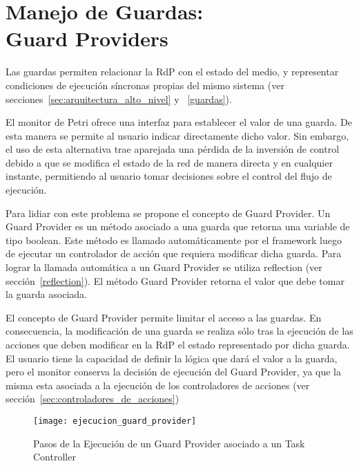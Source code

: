 \section{Manejo de Guardas: \\ Guard Providers}
\label{sec:guard_providers}
Las guardas permiten relacionar la RdP con el estado del medio, y representar
condiciones de ejecución síncronas propias del mismo sistema (ver
secciones~\ref{sec:arquitectura_alto_nivel} y ~\ref{guardas}).

El monitor de Petri ofrece una interfaz para establecer el valor de una guarda.
De esta manera se permite al usuario indicar directamente dicho valor. Sin
embargo, el uso de esta alternativa trae aparejada una pérdida de la inversión
de control debido a que se modifica el estado de la red de manera directa y en
cualquier instante, permitiendo al usuario tomar decisiones sobre el control del
flujo de ejecución.

Para lidiar con este problema se propone el concepto de Guard Provider. Un Guard
Provider es un método asociado a una guarda que retorna una variable de tipo
boolean. Este método es llamado automáticamente por el framework luego de
ejecutar un controlador de acción que requiera modificar dicha guarda. Para
lograr la llamada automática a un Guard Provider se utiliza reflection (ver
sección~\ref{reflection}). El método Guard Provider retorna el valor que debe
tomar la guarda asociada.

El concepto de Guard Provider permite limitar el acceso a las
guardas. En consecuencia, la modificación de una guarda se realiza sólo tras
la ejecución de las acciones que deben modificar en la RdP el estado
representado por dicha guarda. El usuario tiene la capacidad de definir la
lógica que dará el valor a la guarda, pero el monitor conserva la decisión de
ejecución del Guard Provider, ya que la misma esta asociada a la ejecución de
los controladores de acciones (ver sección~\ref{sec:controladores_de_acciones})

\begin{figure}[H]
	\centering
	\texttt{[image: ejecucion\_guard\_provider]}
	\caption{Pasos de la Ejecución de un Guard Provider asociado a un Task
	Controller }
	\label{fig:ejecucion_guard_provider}
\end{figure}